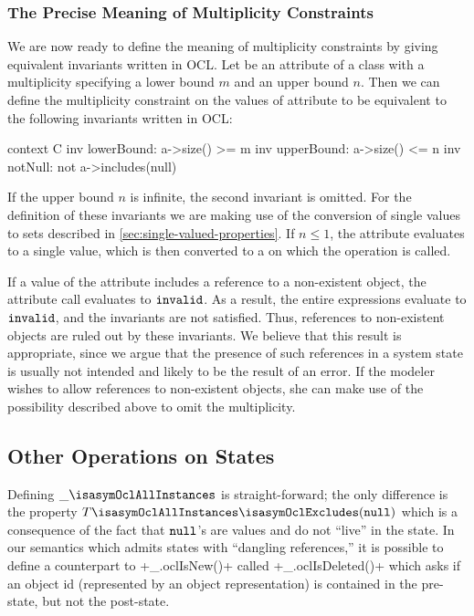 \subsubsection{The Precise Meaning of Multiplicity Constraints}
We are now ready to define the meaning of multiplicity constraints by giving
equivalent invariants written in OCL\@. Let  be an attribute of a
class  with a multiplicity specifying a lower bound $m$ and an
upper bound $n$. Then we can define the multiplicity constraint on the values of
attribute  to be equivalent to the following invariants written in
OCL:
\begin{ocl}
context C inv lowerBound: a->size() >= m
          inv upperBound: a->size() <= n
          inv notNull: not a->includes(null)
\end{ocl}
If the upper bound $n$ is infinite, the second invariant is omitted. For the
definition of these invariants we are making use of the conversion of single
values to sets described in \autoref{sec:single-valued-properties}. If $n
\leq 1$, the attribute  evaluates to a single value, which is then
converted to a  on which the  operation is
called.

If a value of the attribute  includes a reference to a non-existent
object, the attribute call evaluates to $\mathtt{invalid}$. As a result, the
entire expressions evaluate to $\mathtt{invalid}$, and the invariants are not
satisfied. Thus, references to non-existent objects are ruled out by these
invariants. We believe that this result is appropriate, since we argue that the
presence of such references in a system state is usually not intended and likely
to be the result of an error. If the modeler wishes to allow references to
non-existent objects, she can make use of the possibility described above to
omit the multiplicity.


\subsection{Other Operations on States}
Defining $\_\isasymOclAllInstances$
is straight-forward; the only difference is the property
$T\isasymOclAllInstances\isasymOclExcludes(\isasymOclNull)$ which is a
consequence of the fact that ${\mathtt{null}_\text{{}}}$'s are values and do not ``live'' in the
state.  In our semantics which admits states with ``dangling references,'' it is
possible to define a counterpart to \inlineocl+_.oclIsNew()+ called
\inlineocl+_.oclIsDeleted()+ which asks if an object id (represented by an object
representation) is contained in the pre-state, but not the post-state.


